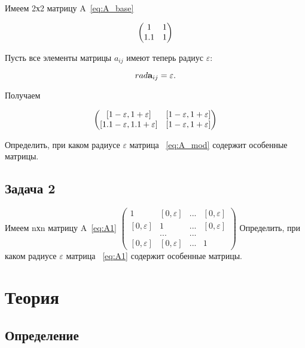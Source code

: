 \documentclass[12pt,a4paper]{scrartcl}
\begin{document}
Имеем 2х2 матрицу A~\eqref{eq:A_base}

\begin{equation}\label{eq:A_base}
\centering
\begin{pmatrix}
1 & 1\\
1.1 & 1
\end{pmatrix}
\end{equation}

Пусть все элементы матрицы $a_{ij}$ имеют теперь радиус $\varepsilon$:

\begin{equation}
\centering
rad \textbf{a}_{ij} = \varepsilon.
\end{equation}

Получаем 

\begin{equation}\label{eq:A_mod}
\centering
\begin{pmatrix}
[1 - \varepsilon, 1 + \varepsilon] & [1 - \varepsilon, 1 + \varepsilon]\\
[1.1 - \varepsilon, 1.1 + \varepsilon] & [1 - \varepsilon, 1 + \varepsilon]
\end{pmatrix}
\end{equation}

Определить, при каком радиусе $\varepsilon$ матрица ~\eqref{eq:A_mod} содержит особенные матрицы.

\subsection{Задача 2}

Имеем nхn матрицу A~\eqref{eq:A1}
$\begin{pmatrix}\label{eq:A1}
1 & [0, \varepsilon] & ... & [0, \varepsilon] \\
[0, \varepsilon] & 1 & ... & [0, \varepsilon] \\
&...&... \\
[0, \varepsilon] & [0, \varepsilon]& ... & 1
\end{pmatrix}
$
Определить, при каком радиусе $\varepsilon$ матрица ~\eqref{eq:A1} содержит особенные матрицы.

\section {Теория}

\subsection {Определение}
\end{document}
